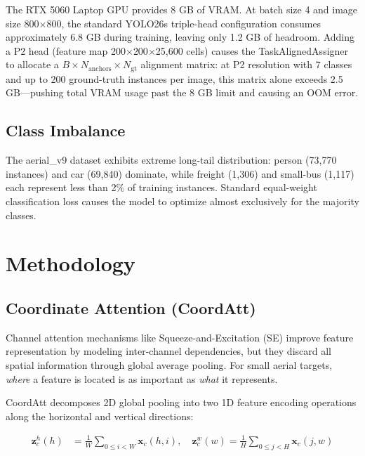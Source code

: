 \documentclass[11pt]{article}
\begin{document}
The RTX 5060 Laptop GPU provides 8 GB of VRAM. At batch size 4 and image size 800$\times$800,
the standard YOLO26s triple-head configuration consumes approximately 6.8 GB during training,
leaving only 1.2 GB of headroom. Adding a P2 head (feature map 200$\times$200$\times$25,600 cells)
causes the TaskAlignedAssigner to allocate a $B \times N_{\text{anchors}} \times N_{\text{gt}}$
alignment matrix: at P2 resolution with 7 classes and up to 200 ground-truth instances per image,
this matrix alone exceeds 2.5 GB—pushing total VRAM usage past the 8 GB limit and causing an OOM
error.

\subsection{Class Imbalance}

The aerial\_v9 dataset exhibits extreme long-tail distribution: person (73,770 instances) and
car (69,840) dominate, while freight (1,306) and small-bus (1,117) each represent less than 2\%
of training instances. Standard equal-weight classification loss causes the model to optimize
almost exclusively for the majority classes.

\section{Methodology}

\subsection{Coordinate Attention (CoordAtt)}

Channel attention mechanisms like Squeeze-and-Excitation (SE) improve feature representation by
modeling inter-channel dependencies, but they discard all spatial information through global
average pooling. For small aerial targets, \textit{where} a feature is located is as important
as \textit{what} it represents.

CoordAtt \cite{hou2021coordinate} decomposes 2D global pooling into two 1D feature encoding
operations along the horizontal and vertical directions:

\begin{align}
    \mathbf{z}^h_c(h) &= \frac{1}{W} \sum_{0 \leq i < W} \mathbf{x}_c(h, i), \quad
    \mathbf{z}^w_c(w) = \frac{1}{H} \sum_{0 \leq j < H} \mathbf{x}_c(j, w)
\end{align}
\end{document}
